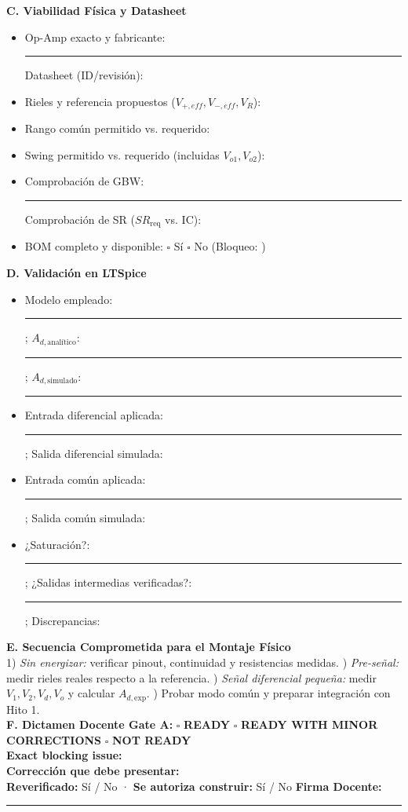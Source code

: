 \documentclass[10pt, a4paper]{article}
\begin{document}
\begin{tcolorbox}[colback=white, colframe=ucbblue, title=\textbf{Formulario de Defensa Documental — Gate A (Hito 2)}]
    \textbf{C. Viabilidad Física y Datasheet}
    \begin{itemize}
        \setlength{\itemsep}{3pt}
        \item Op-Amp exacto y fabricante: \rule{5cm}{0.4pt} \quad Datasheet (ID/revisión): \hrulefill
        \item Rieles y referencia propuestos ($V_{+,eff}, V_{-,eff}, V_R$): \hrulefill
        \item Rango común permitido vs. requerido: \hrulefill
        \item Swing permitido vs. requerido (incluidas $V_{o1}, V_{o2}$): \hrulefill
        \item Comprobación de GBW: \rule{4.5cm}{0.4pt} \quad Comprobación de SR ($SR_{\mathrm{req}}$ vs. IC): \hrulefill
        \item BOM completo y disponible: $\square$ Sí \quad $\square$ No (Bloqueo: \hrulefill)
    \end{itemize}

    \textbf{D. Validación en LTSpice}
    \begin{itemize}
        \setlength{\itemsep}{3pt}
        \item Modelo empleado: \rule{4cm}{0.4pt} ; \quad $A_{d,\text{analítico}}$: \rule{2.2cm}{0.4pt} ; \quad $A_{d,\text{simulado}}$: \rule{2.2cm}{0.4pt}
        \item Entrada diferencial aplicada: \rule{3cm}{0.4pt} ; \quad Salida diferencial simulada: \hrulefill
        \item Entrada común aplicada: \rule{3cm}{0.4pt} ; \quad Salida común simulada: \hrulefill
        \item ¿Saturación?: \rule{2cm}{0.4pt} ; \quad ¿Salidas intermedias verificadas?: \rule{2cm}{0.4pt} ; \quad Discrepancias: \hrulefill
    \end{itemize}

    \textbf{E. Secuencia Comprometida para el Montaje Físico} \\
    1) \textit{Sin energizar:} verificar pinout, continuidad y resistencias medidas. ) \textit{Pre-señal:} medir rieles reales respecto a la referencia. ) \textit{Señal diferencial pequeña:} medir $V_1, V_2, V_d, V_o$ y calcular $A_{d,\mathrm{exp}}$. ) Probar modo común y preparar integración con Hito 1. \\[0.2cm]
    \textbf{F. Dictamen Docente Gate A:} \quad $\square$ \textbf{READY} \qquad $\square$ \textbf{READY WITH MINOR CORRECTIONS} \qquad $\square$ \textbf{NOT READY} \\[0.15cm]
    \textbf{Exact blocking issue:} \hrulefill \\[0.15cm]
    \textbf{Corrección que debe presentar:} \hrulefill \\[0.15cm]
    \textbf{Reverificado:} Sí / No \quad · \quad \textbf{Se autoriza construir:} Sí / No \hfill \textbf{Firma Docente:} \rule{3.5cm}{0.4pt}
\end{tcolorbox}
\end{document}
